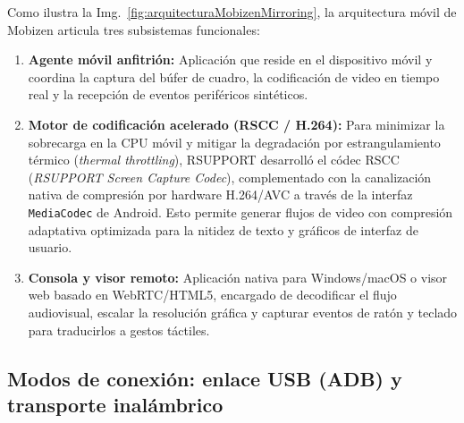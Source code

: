 \documentclass[12pt]{article}
\begin{document}
Como ilustra la Img.~\ref{fig:arquitecturaMobizenMirroring}, la arquitectura móvil de Mobizen articula tres subsistemas funcionales:
\begin{enumerate}[noitemsep, topsep=4pt]
    \item \textbf{Agente móvil anfitrión:} Aplicación que reside en el dispositivo móvil y coordina la captura del búfer de cuadro, la codificación de video en tiempo real y la recepción de eventos periféricos sintéticos.
    \item \textbf{Motor de codificación acelerado (RSCC / H.264):} Para minimizar la sobrecarga en la CPU móvil y mitigar la degradación por estrangulamiento térmico (\textit{thermal throttling}), RSUPPORT desarrolló el códec RSCC (\textit{RSUPPORT Screen Capture Codec}), complementado con la canalización nativa de compresión por hardware H.264/AVC a través de la interfaz \texttt{MediaCodec} de Android. Esto permite generar flujos de video con compresión adaptativa optimizada para la nitidez de texto y gráficos de interfaz de usuario.
    \item \textbf{Consola y visor remoto:} Aplicación nativa para Windows/macOS o visor web basado en WebRTC/HTML5, encargado de decodificar el flujo audiovisual, escalar la resolución gráfica y capturar eventos de ratón y teclado para traducirlos a gestos táctiles.
\end{enumerate}

\subsection{Modos de conexión: enlace USB (ADB) y transporte inalámbrico}\label{sec:mobizenModosConexion}
\end{document}
